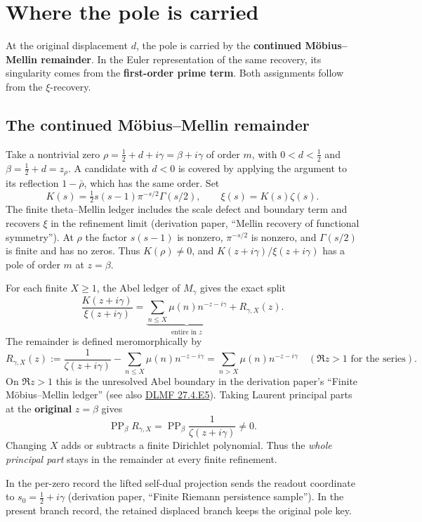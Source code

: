 \documentclass[11pt]{article}
\begin{document}
\section{Where the pole is carried}

At the original displacement \(d\), the pole is carried by the \textbf{continued M\"obius--Mellin remainder}. In the Euler representation of the same recovery, its singularity comes from the \textbf{first-order prime term}. Both assignments follow from the \(\xi\)-recovery.

\subsection{The continued M\"obius--Mellin remainder}

Take a nontrivial zero \(\rho=\tfrac12+d+i\gamma=\beta+i\gamma\) of order \(m\), with \(0<d<\tfrac12\) and \(\beta=\tfrac12+d=z_\rho\). A candidate with \(d<0\) is covered by applying the argument to its reflection \(1-\bar\rho\), which has the same order. Set
\[
K(s)=\tfrac12s(s-1)\pi^{-s/2}\Gamma(s/2),
\qquad
\xi(s)=K(s)\zeta(s).
\]
The finite theta--Mellin ledger includes the scale defect and boundary term and recovers \(\xi\) in the refinement limit (derivation paper, ``Mellin recovery of functional symmetry''). At \(\rho\) the factor \(s(s-1)\) is nonzero, \(\pi^{-s/2}\) is nonzero, and \(\Gamma(s/2)\) is finite and has no zeros. Thus \(K(\rho)\ne0\), and \(K(z+i\gamma)/\xi(z+i\gamma)\) has a pole of order \(m\) at \(z=\beta\).

For each finite \(X\ge1\), the Abel ledger of \(M_\gamma\) gives the exact split
\[
\frac{K(z+i\gamma)}{\xi(z+i\gamma)}
=
\underbrace{\sum_{n\le X}\mu(n)n^{-z-i\gamma}}_{\text{entire in }z}
+
R_{\gamma,X}(z).
\]
The remainder is defined meromorphically by
\[
R_{\gamma,X}(z)
:=
\frac{1}{\zeta(z+i\gamma)}
-
\sum_{n\le X}\mu(n)n^{-z-i\gamma}
=
\sum_{n>X}\mu(n)n^{-z-i\gamma}
\quad(\Re z>1\text{ for the series}).
\]
On \(\Re z>1\) this is the unresolved Abel boundary in the derivation paper's ``Finite M\"obius--Mellin ledger'' (see also \href{https://dlmf.nist.gov/27.4.E5}{DLMF 27.4.E5}). Taking Laurent principal parts at the \textbf{original} \(z=\beta\) gives
\[
\boxed{\operatorname{PP}_{\beta}R_{\gamma,X}
=\operatorname{PP}_{\beta}\frac1{\zeta(z+i\gamma)}\ne0.}
\]
Changing \(X\) adds or subtracts a finite Dirichlet polynomial. Thus the \emph{whole principal part} stays in the remainder at every finite refinement.

In the per-zero record the lifted self-dual projection sends the readout coordinate to \(s_0=\tfrac12+i\gamma\) (derivation paper, ``Finite Riemann persistence sample''). In the present branch record, the retained displaced branch keeps the original pole key.
\end{document}
